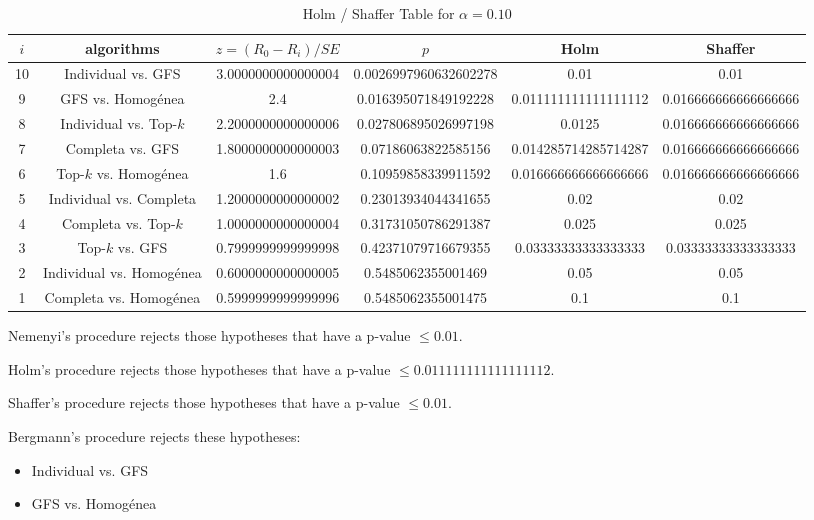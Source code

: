 \documentclass[a4paper,10pt]{article}
\begin{document}
\begin{landscape}
\begin{table}[!htp]
\centering\tiny
\caption{Holm / Shaffer Table for $\alpha=0.10$}
\begin{tabular}{cccccc}
$i$&algorithms&$z=(R_0 - R_i)/SE$&$p$&Holm&Shaffer\\
\hline
10&Individual vs. GFS&3.0000000000000004&0.0026997960632602278&0.01&0.01\\
9&GFS vs. Homogénea&2.4&0.016395071849192228&0.011111111111111112&0.016666666666666666\\
8&Individual vs. Top-$k$&2.2000000000000006&0.027806895026997198&0.0125&0.016666666666666666\\
7&Completa vs. GFS&1.8000000000000003&0.07186063822585156&0.014285714285714287&0.016666666666666666\\
6&Top-$k$ vs. Homogénea&1.6&0.10959858339911592&0.016666666666666666&0.016666666666666666\\
5&Individual vs. Completa&1.2000000000000002&0.23013934044341655&0.02&0.02\\
4&Completa vs. Top-$k$&1.0000000000000004&0.31731050786291387&0.025&0.025\\
3&Top-$k$ vs. GFS&0.7999999999999998&0.42371079716679355&0.03333333333333333&0.03333333333333333\\
2&Individual vs. Homogénea&0.6000000000000005&0.5485062355001469&0.05&0.05\\
1&Completa vs. Homogénea&0.5999999999999996&0.5485062355001475&0.1&0.1\\
\hline
\end{tabular}
\end{table}
Nemenyi's procedure rejects those hypotheses that have a p-value $\le0.01$.


Holm's procedure rejects those hypotheses that have a p-value $\le0.011111111111111112$.


Shaffer's procedure rejects those hypotheses that have a p-value $\le0.01$.


Bergmann's procedure rejects these hypotheses:


\begin{itemize}


\item Individual vs. GFS
\item GFS vs. Homogénea
\end{itemize}



\end{landscape}
\end{document}
